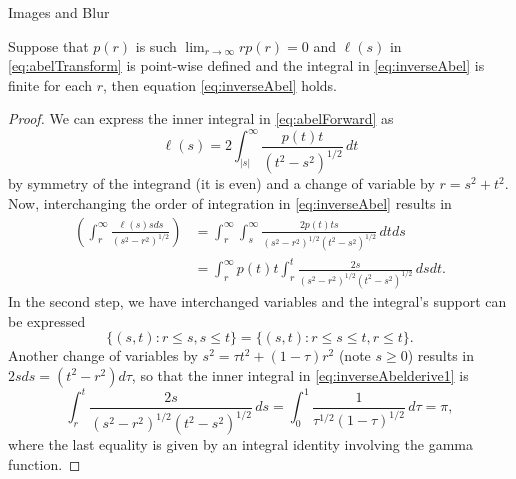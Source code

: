 \begin{chapter}{Images and Blur}
  \begin{prop}
    Suppose that $p(r)$ is such $\lim_{r\to\infty}rp(r) = 0$ and $\ell(s)$ in \eqref{eq:abelTransform} is point-wise defined and the integral in \eqref{eq:inverseAbel} is finite for each $r$, then equation \eqref{eq:inverseAbel} holds.
  \end{prop}
  \begin{proof}
  We can express the inner integral in \eqref{eq:abelForward} as
  \begin{equation}
    \ell(s) = 2\int_{|s|}^\infty \frac{p(t) t}{(t^2 - s^2)^{1/2}}\,dt \label{eq:abelForward2}
  \end{equation}
  by symmetry of the integrand (it is even) and a change of variable by $r = s^2 + t^2$.
  Now, interchanging the order of integration in \eqref{eq:inverseAbel} results in
  \begin{align} 
    \left(\int_r^\infty \frac{\ell(s) s ds}{ (s^2 - r^2)^{1/2} } \right)  
    &= \int_r^\infty\int_s^\infty \frac{2p(t) ts}{(s^2 - r^2)^{1/2}(t^2 - s^2)^{1/2}}\,dtds \nonumber\\
    &= \int_r^\infty p(t) t\int_r^t \frac{2s}{(s^2 - r^2)^{1/2}(t^2 - s^2)^{1/2}}\,dsdt. \label{eq:inverseAbelderive1}
  \end{align} 
  In the second step, we have interchanged variables and the integral's support can be expressed 
  \begin{equation} \label{eq:inverseAbleSupport}
    \{(s,t): r \le s, s\le t\} = \{(s,t): r\le s \le t, r\le t \}.
  \end{equation}
  Another change of variables by $s^2 = \tau t^2 + (1-\tau)r^2$ (note $s\ge0$) results in $2sds = (t^2 - r^2)d\tau$, 
  so that the inner integral in \eqref{eq:inverseAbelderive1} is
  \begin{equation}
    \int_r^t \frac{2s}{(s^2 - r^2)^{1/2}(t^2 - s^2)^{1/2}}\,ds
    = \int_0^1 \frac {1}{\tau^{1/2}(1-\tau)^{1/2}}\,d\tau = \pi, \label{eq:gammaIntegral}
  \end{equation}
  where the last equality is given by an integral identity involving the gamma function.

\end{proof}
\end{chapter}
